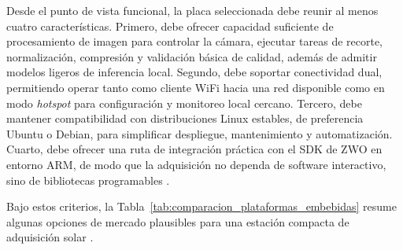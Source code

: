 Desde el punto de vista funcional, la placa seleccionada debe reunir al menos
cuatro características. Primero, debe ofrecer capacidad suficiente de
procesamiento de imagen para controlar la cámara, ejecutar tareas de recorte,
normalización, compresión y validación básica de calidad, además de admitir
modelos ligeros de inferencia local. Segundo, debe soportar conectividad dual,
permitiendo operar tanto como cliente WiFi hacia una red disponible como en modo
\textit{hotspot} para configuración y monitoreo local cercano. Tercero, debe
mantener compatibilidad con distribuciones Linux estables, de preferencia Ubuntu
o Debian, para simplificar despliegue, mantenimiento y automatización. Cuarto,
debe ofrecer una ruta de integración práctica con el SDK de ZWO en entorno ARM,
de modo que la adquisición no dependa de software interactivo, sino de bibliotecas
programables \citep{nmcliHotspot2026,zwoASILinuxManual}.

Bajo estos criterios, la Tabla~\ref{tab:comparacion_plataformas_embebidas}
resume algunas opciones de mercado plausibles para una estación compacta de
adquisición solar \citep{raspberryPi5Docs2026,jetsonOrinNanoGuide2026,orangePi5Plus2026,rock5bDocs2026}.

